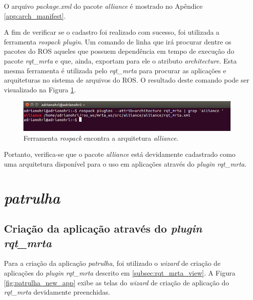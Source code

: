             O arquivo \textit{package.xml} do pacote \textit{alliance} é mostrado no Apêndice \ref{app:arch_manifest}.
            
            A fim de verificar se o cadastro foi realizado com sucesso, foi utilizada a ferramenta \textit{rospack plugin}. Um comando de linha que irá procurar dentre os pacotes do ROS aqueles que possuem dependência em tempo de execução do pacote \textit{rqt\_mrta} e que, ainda, exportam para ele o atributo \textit{architecture}. Esta mesma ferramenta é utilizada pelo \textit{rqt\_mrta} para procurar as aplicações e arquiteturas no sistema de arquivos do ROS. O resultado deste comando pode ser visualizado na Figura \ref{fig:rospack_alliance}.
            
            \begin{figure}[htb]
                \centering
                \includegraphics[width=.95\textwidth]{Figuras/4_resultados/rqt_mrta_alliance.png}
                \caption{Ferramenta \textit{rospack} encontra a arquitetura \textit{alliance}.} \label{fig:rospack_alliance}
            \end{figure}
            
            Portanto, verifica-se que o pacote \textit{alliance} está devidamente cadastrado como uma arquitetura disponível para o uso em aplicações através do \textit{plugin rqt\_mrta}.
        
    \section{\textit{patrulha}} \label{sec:patrulha}
    
        \subsection{Criação da aplicação através do \textit{plugin rqt\_mrta}} \label{subsec:criacao_patrulha}
            Para a criação da aplicação \textit{patrulha}, foi utilizado o \textit{wizard} de criação de aplicações do \textit{plugin rqt\_mrta} descrito em \ref{subsec:rqt_mrta_view}. A Figura \ref{fig:patrulha_new_app} exibe as telas do \textit{wizard} de criação de aplicação do \textit{rqt\_mrta} devidamente preenchidas.
        
